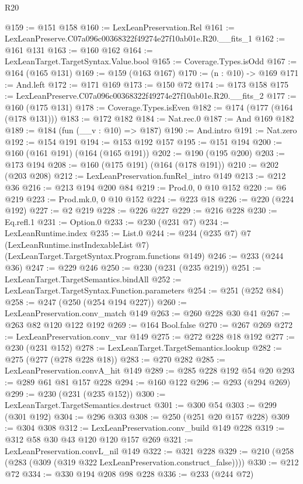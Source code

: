 \begin{lexlean}{R20}
\begin{coremodule}
@159 := @151 @158
@160 := LexLeanPreservation.Rel
@161 := LexLeanPreserve.C07a096c00368322f49274e27f10ab01e.R20.__fits_1
@162 := @161 @131
@163 := @160 @162
@164 := LexLeanTarget.TargetSyntax.Value.bool
@165 := Coverage.Types.isOdd
@167 := @164 (@165 @131)
@169 := @159 (@163 @167)
@170 := (n : @10) -> @169
@171 := And.left
@172 := @171 @169
@173 := @150 @72
@174 := @173 @158
@175 := LexLeanPreserve.C07a096c00368322f49274e27f10ab01e.R20.__fits_2
@177 := @160 (@175 @131)
@178 := Coverage.Types.isEven
@182 := @174 (@177 (@164 (@178 @131)))
@183 := @172 @182
@184 := Nat.rec.{0}
@187 := And @169 @182
@189 := @184 (fun (__v : @10) => @187)
@190 := And.intro
@191 := Nat.zero
@192 := @154 @191
@194 := @153 @192 @157
@195 := @151 @194
@200 := @160 (@161 @191) (@164 (@165 @191))
@202 := @190 (@195 @200)
@203 := @173 @194
@208 := @160 (@175 @191) (@164 (@178 @191))
@210 := @202 (@203 @208)
@212 := LexLeanPreservation.funRel_intro @149
@213 := @212 @36
@216 := @213 @194 @200 @84
@219 := Prod.{0, 0} @10 @152
@220 := @6 @219
@223 := Prod.mk.{0, 0} @10 @152
@224 := @223 @18
@226 := @220 (@224 @192)
@227 := @2 @219
@228 := @226 @227
@229 := @216 @228
@230 := Eq.refl.{1}
@231 := Option.{0}
@233 := @230 (@231 @7)
@234 := LexLeanRuntime.index
@235 := List.{0}
@244 := @234
    (@235 @7)
    @7
    (LexLeanRuntime.instIndexableList @7)
    (LexLeanTarget.TargetSyntax.Program.functions @149)
@246 := @233 (@244 @36)
@247 := @229 @246
@250 := @230 (@231 (@235 @219))
@251 := LexLeanTarget.TargetSemantics.bindAll
@252 := LexLeanTarget.TargetSyntax.Function.parameters
@254 := @251 (@252 @84)
@258 := @247 (@250 (@254 @194 @227))
@260 := LexLeanPreservation.conv_match @149
@263 := @260 @228 @30 @41
@267 := @263 @82 @120 @122 @192
@269 := @164 Bool.false
@270 := @267 @269
@272 := LexLeanPreservation.conv_var @149
@275 := @272 @228 @18 @192
@277 := @230 (@231 @152)
@278 := LexLeanTarget.TargetSemantics.lookup
@282 := @275 (@277 (@278 @228 @18))
@283 := @270 @282
@285 := LexLeanPreservation.convA_hit @149
@289 := @285 @228 @192 @54 @20
@293 := @289 @61 @81 @157 @228
@294 := @160 @122
@296 := @293 (@294 @269)
@299 := @230 (@231 (@235 @152))
@300 := LexLeanTarget.TargetSemantics.destruct
@301 := @300 @54
@303 := @299 (@301 @192)
@304 := @296 @303
@308 := @250 (@251 @20 @157 @228)
@309 := @304 @308
@312 := LexLeanPreservation.conv_build @149 @228
@319 := @312 @58 @30 @43 @120 @120 @157 @269
@321 := LexLeanPreservation.convL_nil @149
@322 := @321 @228
@329 := @210 (@258 (@283 (@309 (@319 @322 LexLeanPreservation.construct_false))))
@330 := @212 @72
@334 := @330 @194 @208 @98 @228
@336 := @233 (@244 @72)

\end{coremodule}
\end{lexlean}

